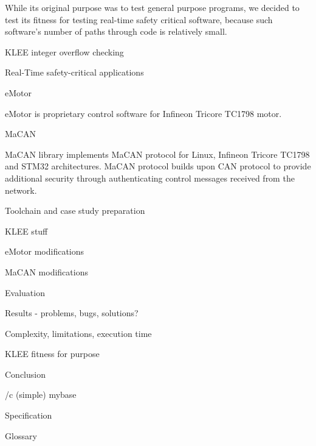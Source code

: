 While its original purpose was to test general purpose programs, we 
decided to test its fitness for testing real-time safety critical software,
because such software's number of paths through code is relatively small.

\secc KLEE integer overflow checking

\sec Real-Time safety-critical applications

\secc eMotor

eMotor is proprietary control software for Infineon Tricore TC1798 motor.

\secc MaCAN

MaCAN library  implements MaCAN protocol for Linux, Infineon Tricore TC1798 and STM32 architectures.
MaCAN protocol builds upon CAN protocol to provide additional security through authenticating control messages
received from the network.

\chap Toolchain and case study preparation

\sec KLEE stuff


\sec eMotor modifications

\sec MaCAN modifications

\chap Evaluation

\sec Results - problems, bugs, solutions?


\sec Complexity, limitations, execution time

\sec KLEE fitness for purpose

\chap Conclusion



\bibchap
\usebib/c (simple) mybase


\app Specification



\app Glossary\par
\makeglos

\nextoddpage

\bye
